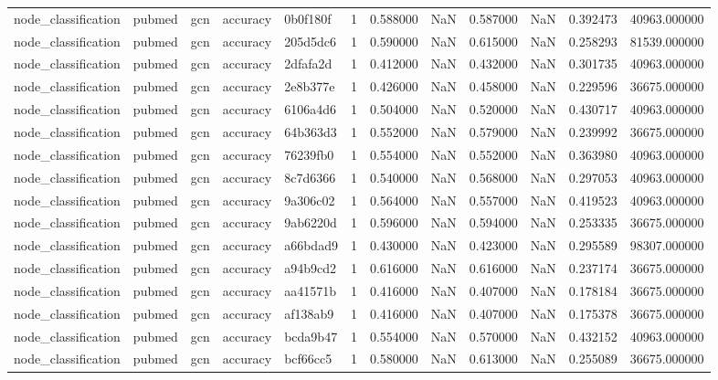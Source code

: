 \begin{tabular}{lllllrrrrrrr}
node_classification & pubmed & gcn & accuracy & 0b0f180f & 1 & 0.588000 & NaN & 0.587000 & NaN & 0.392473 & 40963.000000 \\
node_classification & pubmed & gcn & accuracy & 205d5dc6 & 1 & 0.590000 & NaN & 0.615000 & NaN & 0.258293 & 81539.000000 \\
node_classification & pubmed & gcn & accuracy & 2dfafa2d & 1 & 0.412000 & NaN & 0.432000 & NaN & 0.301735 & 40963.000000 \\
node_classification & pubmed & gcn & accuracy & 2e8b377e & 1 & 0.426000 & NaN & 0.458000 & NaN & 0.229596 & 36675.000000 \\
node_classification & pubmed & gcn & accuracy & 6106a4d6 & 1 & 0.504000 & NaN & 0.520000 & NaN & 0.430717 & 40963.000000 \\
node_classification & pubmed & gcn & accuracy & 64b363d3 & 1 & 0.552000 & NaN & 0.579000 & NaN & 0.239992 & 36675.000000 \\
node_classification & pubmed & gcn & accuracy & 76239fb0 & 1 & 0.554000 & NaN & 0.552000 & NaN & 0.363980 & 40963.000000 \\
node_classification & pubmed & gcn & accuracy & 8c7d6366 & 1 & 0.540000 & NaN & 0.568000 & NaN & 0.297053 & 40963.000000 \\
node_classification & pubmed & gcn & accuracy & 9a306c02 & 1 & 0.564000 & NaN & 0.557000 & NaN & 0.419523 & 40963.000000 \\
node_classification & pubmed & gcn & accuracy & 9ab6220d & 1 & 0.596000 & NaN & 0.594000 & NaN & 0.253335 & 36675.000000 \\
node_classification & pubmed & gcn & accuracy & a66bdad9 & 1 & 0.430000 & NaN & 0.423000 & NaN & 0.295589 & 98307.000000 \\
node_classification & pubmed & gcn & accuracy & a94b9cd2 & 1 & 0.616000 & NaN & 0.616000 & NaN & 0.237174 & 36675.000000 \\
node_classification & pubmed & gcn & accuracy & aa41571b & 1 & 0.416000 & NaN & 0.407000 & NaN & 0.178184 & 36675.000000 \\
node_classification & pubmed & gcn & accuracy & af138ab9 & 1 & 0.416000 & NaN & 0.407000 & NaN & 0.175378 & 36675.000000 \\
node_classification & pubmed & gcn & accuracy & bcda9b47 & 1 & 0.554000 & NaN & 0.570000 & NaN & 0.432152 & 40963.000000 \\
node_classification & pubmed & gcn & accuracy & bcf66cc5 & 1 & 0.580000 & NaN & 0.613000 & NaN & 0.255089 & 36675.000000 \\

\end{tabular}
